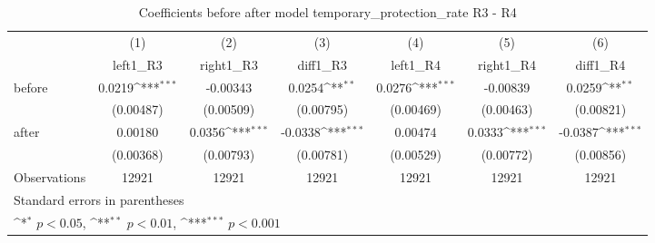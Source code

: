\begin{table}[!ht]\centering \footnotesize
\def\sym#1{\ifmmode^{#1}\else\(^{#1}\)\fi}
\caption{Coefficients before after model temporary\_protection\_rate R3 - R4}
\begin{tabular}{l*{6}{c}}
\hline\hline
                    &\multicolumn{1}{c}{(1)}&\multicolumn{1}{c}{(2)}&\multicolumn{1}{c}{(3)}&\multicolumn{1}{c}{(4)}&\multicolumn{1}{c}{(5)}&\multicolumn{1}{c}{(6)}\\
                    &\multicolumn{1}{c}{left1\_R3}&\multicolumn{1}{c}{right1\_R3}&\multicolumn{1}{c}{diff1\_R3}&\multicolumn{1}{c}{left1\_R4}&\multicolumn{1}{c}{right1\_R4}&\multicolumn{1}{c}{diff1\_R4}\\
\hline
before              &      0.0219\sym{***}&    -0.00343         &      0.0254\sym{**} &      0.0276\sym{***}&    -0.00839         &      0.0259\sym{**} \\
                    &   (0.00487)         &   (0.00509)         &   (0.00795)         &   (0.00469)         &   (0.00463)         &   (0.00821)         \\
[1em]
after               &     0.00180         &      0.0356\sym{***}&     -0.0338\sym{***}&     0.00474         &      0.0333\sym{***}&     -0.0387\sym{***}\\
                    &   (0.00368)         &   (0.00793)         &   (0.00781)         &   (0.00529)         &   (0.00772)         &   (0.00856)         \\
\hline
Observations        &       12921         &       12921         &       12921         &       12921         &       12921         &       12921         \\
\hline\hline
\multicolumn{7}{l}{\footnotesize Standard errors in parentheses}\\
\multicolumn{7}{l}{\footnotesize \sym{*} \(p<0.05\), \sym{**} \(p<0.01\), \sym{***} \(p<0.001\)}\\
\end{tabular}
\end{table}
